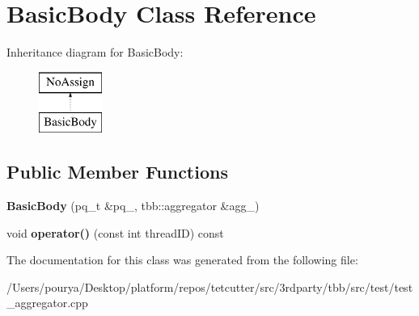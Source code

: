 \hypertarget{classBasicBody}{}\section{Basic\+Body Class Reference}
\label{classBasicBody}
Inheritance diagram for Basic\+Body\+:\begin{figure}[H]
\begin{center}
\leavevmode
\includegraphics[height=2.000000cm]{classBasicBody}
\end{center}
\end{figure}
\subsection*{Public Member Functions}
\begin{DoxyCompactItemize}
\item 
\hypertarget{classBasicBody_ad7490accb54bc5171b84ffc0f30fb3c8}{}{\bfseries Basic\+Body} (pq\+\_\+t \&pq\+\_\+, tbb\+::aggregator \&agg\+\_\+)\label{classBasicBody_ad7490accb54bc5171b84ffc0f30fb3c8}

\item 
\hypertarget{classBasicBody_a4c29e7453ccc16ae077418913ea6ada4}{}void {\bfseries operator()} (const int thread\+I\+D) const \label{classBasicBody_a4c29e7453ccc16ae077418913ea6ada4}

\end{DoxyCompactItemize}


The documentation for this class was generated from the following file\+:\begin{DoxyCompactItemize}
\item 
/\+Users/pourya/\+Desktop/platform/repos/tetcutter/src/3rdparty/tbb/src/test/test\+\_\+aggregator.\+cpp\end{DoxyCompactItemize}
